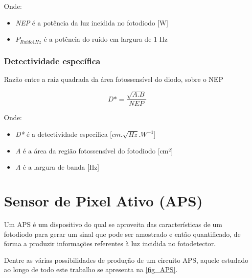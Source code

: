 Onde:
\begin{itemize}
    \item \emph{NEP} \'e a pot\^encia da luz incidida no fotodiodo [W]
    \item \emph{$P_{Ruído 1 Hz}$} \'e a pot\^encia do ruído em largura de 1 Hz
\end{itemize}

\subsubsection{Detectividade espec\'ifica}
Razão entre a raiz quadrada da área fotossensível do diodo, sobre o NEP

\begin{equation}
    D* = \frac{\sqrt{A.B}}{NEP}
\end{equation}

Onde:

\begin{itemize}
    \item \emph{D*} \'e a detectividade espec\'ifica [$cm.\sqrt{Hz}.W^{-1}$]
    \item \emph{A} \'e a \'area da regi\~ao fotossens\'ivel do fotodiodo [cm²]
    \item \emph{A} \'e a largura de banda [Hz]
\end{itemize}

\section{Sensor de Pixel Ativo (APS)}
\label{section:APS}
Um APS \'e um dispositivo do qual se aproveita das características de um fotodiodo para gerar um sinal que pode ser amostrado e então quantificado, de forma a produzir informações referentes à luz incidida no fotodetector.

Dentre as várias possibilidades de produção de um circuito APS, aquele estudado ao longo de todo este trabalho se apresenta na \autoref{fig_APS}.

